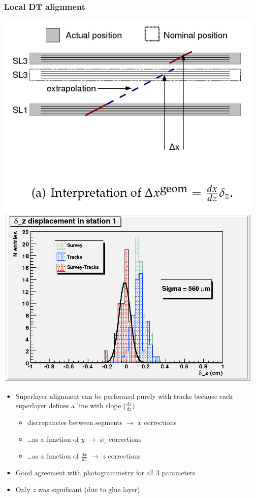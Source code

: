 \documentclass[compress]{beamer}
\begin{document}
\begin{frame}
\frametitle{Local DT alignment}

\vfill
\includegraphics[width=0.45\linewidth]{dtsuperlayer.png}
\hfill \includegraphics[width=0.5\linewidth]{dtinternal_crosscheck.png}

\vfill
\begin{itemize}
\item Superlayer alignment can be performed purely with tracks because each superlayer defines a line with slope ($\frac{dx}{dz}$)
\begin{itemize}
\item discrepancies between segments $\to$ $x$ corrections
\item \ldots as a function of $y$ $\to$ $\phi_z$ corrections
\item \ldots as a function of $\frac{dx}{dz}$ $\to$ $z$ corrections
\end{itemize}
\item Good agreement with photogrammetry for all 3 parameters
\item Only $z$ was significant (due to glue layer)
\end{itemize}
\end{frame}
\end{document}
